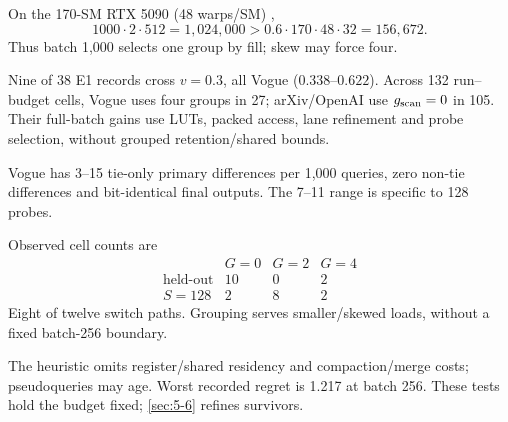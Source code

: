 On the 170-SM RTX 5090 (48 warps/SM) \cite{blackwell_tuning},
\[
 1000\cdot2\cdot512=1{,}024{,}000
 >0.6\cdot170\cdot48\cdot32=156{,}672.
\]
Thus batch 1,000 selects one group by fill; skew may force four.

Nine of 38 E1 records cross $v=0.3$, all Vogue ($0.338$--$0.622$). Across 132 run--budget cells, Vogue uses four groups in 27; arXiv/OpenAI use $g_{\mathrm{scan}}=0$ in 105. Their full-batch gains use LUTs, packed access, lane refinement and probe selection, without grouped retention/shared bounds.

Vogue has 3--15 tie-only primary differences per 1,000 queries, zero non-tie differences and bit-identical final outputs. The 7--11 range is specific to 128 probes.

Observed cell counts are
\[
 \begin{array}{c|rrr}
 &G=0&G=2&G=4\\\hline
 \text{held-out}&10&0&2\\
 S=128&2&8&2
 \end{array}
\]
Eight of twelve switch paths. Grouping serves smaller/skewed loads, without a fixed batch-256 boundary.

The heuristic omits register/shared residency and compaction/merge costs; pseudoqueries may age. Worst recorded regret is 1.217 at batch 256. These tests hold the budget fixed; \cref{sec:5-6} refines survivors.